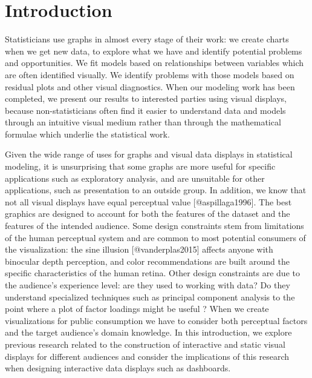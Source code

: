 \documentclass[
]{article}
\author{}
\date{\vspace{-2.5em}}
\begin{document}
\hypertarget{introduction}{%
\section{Introduction}\label{introduction}}

Statisticians use graphs in almost every stage of their work: we create
charts when we get new data, to explore what we have and identify
potential problems and opportunities. We fit models based on
relationships between variables which are often identified visually. We
identify problems with those models based on residual plots and other
visual diagnostics. When our modeling work has been completed, we
present our results to interested parties using visual displays, because
non-statisticians often find it easier to understand data and models
through an intuitive visual medium rather than through the mathematical
formulae which underlie the statistical work.

Given the wide range of uses for graphs and visual data displays in
statistical modeling, it is unsurprising that some graphs are more
useful for specific applications such as exploratory analysis, and are
unsuitable for other applications, such as presentation to an outside
group. In addition, we know that not all visual displays have equal
perceptual value {[}@aspillaga1996{]}. The best graphics are designed to
account for both the features of the dataset and the features of the
intended audience. Some design constraints stem from limitations of the
human perceptual system and are common to most potential consumers of
the visualization: the sine illusion {[}@vanderplas2015{]} affects
anyone with binocular depth perception, and color recommendations are
built around the specific characteristics of the human retina. Other
design constraints are due to the audience's experience level: are they
used to working with data? Do they understand specialized techniques
such as principal component analysis to the point where a plot of factor
loadings might be  useful ? When we create
visualizations for public consumption we have to consider both
perceptual factors and the target audience's domain knowledge. In this
introduction, we explore previous research related to the construction
of interactive and static visual displays for different audiences and
consider the implications of this research when designing interactive
data displays such as dashboards.

\end{document}
